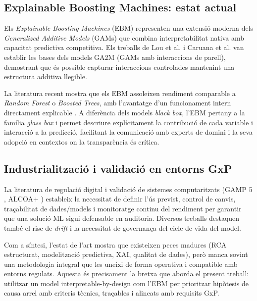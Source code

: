 \subsection{Explainable Boosting Machines: estat actual}

Els \emph{Explainable Boosting Machines} (EBM) representen una extensió moderna dels \emph{Generalized Additive Models} (GAMs) \cite{hastie1990_gam} que combina interpretabilitat nativa amb capacitat predictiva competitiva. Els treballs de Lou et al. \cite{lou2013_ga2m} i Caruana et al. \cite{caruana2015_intelligible} van establir les bases dels models GA2M (GAMs amb interaccions de parell), demostrant que és possible capturar interaccions controlades mantenint una estructura additiva llegible.

La literatura recent mostra que els EBM assoleixen rendiment comparable a \emph{Random Forest} o \emph{Boosted Trees}, amb l'avantatge d'un funcionament intern directament explicable \cite{ebm_nori,piml_ebm,ebm_2025}. A diferència dels models \emph{black box}, l'EBM pertany a la família \emph{glass box} i permet descriure explícitament la contribució de cada variable i interacció a la predicció, facilitant la comunicació amb experts de domini i la seva adopció en contextos on la transparència és crítica.

\subsection{Industrialització i validació en entorns GxP}

La literatura de regulació digital i validació de sistemes computaritzats (GAMP 5 \cite{gamp5}, ALCOA+ \cite{alcoa}) estableix la necessitat de definir l'ús previst, control de canvis, traçabilitat de dades/models i monitoratge continu del rendiment per garantir que una solució ML sigui defensable en auditoria. Diversos treballs destaquen també el risc de \emph{drift} \cite{lu2020drift} i la necessitat de governança del cicle de vida del model.

Com a síntesi, l'estat de l'art mostra que existeixen peces madures (RCA estructurat, modelització predictiva, XAI, qualitat de dades), però manca sovint una metodologia integral que les uneixi de forma operativa i compatible amb entorns regulats. Aquesta és precisament la bretxa que aborda el present treball: utilitzar un model interpretable-by-design com l'EBM per prioritzar hipòtesis de causa arrel amb criteris tècnics, traçables i alineats amb requisits GxP.
